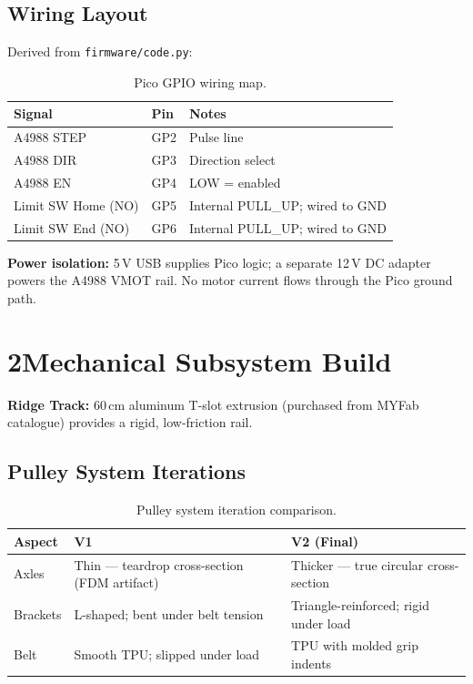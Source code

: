 \documentclass[12pt]{article}
\begin{document}
\subsection{Wiring Layout}
Derived from \texttt{firmware/code.py}:

\begin{table}[H]
\centering
\small
\begin{tabular}{@{}l l l@{}}
\toprule
\textbf{Signal} & \textbf{Pin} & \textbf{Notes} \\
\midrule
A4988 STEP  & GP2 & Pulse line \\
A4988 DIR   & GP3 & Direction select \\
A4988 EN    & GP4 & LOW = enabled \\
Limit SW Home (NO) & GP5 & Internal PULL\_UP; wired to GND \\
Limit SW End (NO)  & GP6 & Internal PULL\_UP; wired to GND \\
\bottomrule
\end{tabular}
\caption{Pico GPIO wiring map.}
\end{table}

\textbf{Power isolation:} 5\,V USB supplies Pico logic; a separate 12\,V DC adapter powers the A4988 VMOT rail. No motor current flows through the Pico ground path.

\section{2\quad Mechanical Subsystem Build}

\textbf{Ridge Track:} 60\,cm aluminum T-slot extrusion (purchased from MYFab
catalogue) provides a rigid, low-friction rail.

\subsection{Pulley System Iterations}

\begin{table}[H]
\centering
\small
\begin{tabularx}{\textwidth}{@{}l X X@{}}
\toprule
\textbf{Aspect} & \textbf{V1} & \textbf{V2 (Final)} \\
\midrule
Axles       & Thin --- teardrop cross-section (FDM artifact) & Thicker --- true circular cross-section \\
Brackets    & L-shaped; bent under belt tension               & Triangle-reinforced; rigid under load \\
Belt        & Smooth TPU; slipped under load                  & TPU with molded grip indents \\
\bottomrule
\end{tabularx}
\caption{Pulley system iteration comparison.}
\end{table}
\end{document}
